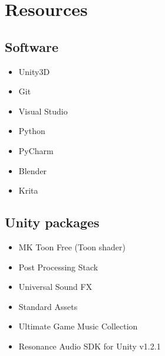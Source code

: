 \chapter{Resources}
\section{Software}
\begin{itemize}
\item Unity3D
\item Git
\item Visual Studio
\item Python
\item PyCharm
\item Blender
\item Krita
\end{itemize}

\section{Unity packages}
\begin{itemize}
\item MK Toon Free (Toon shader) %
\item Post Processing Stack %
\item Universal Sound FX %
\item Standard Assets %
\item Ultimate Game Music Collection %
\item Resonance Audio SDK for Unity v1.2.1 %
\end{itemize}

